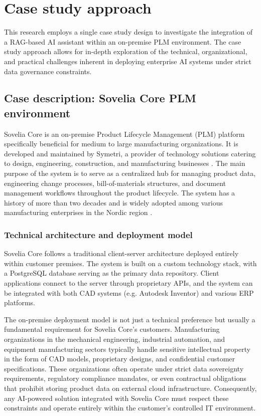 \section{Case study approach}
\label{sec:case-study-approach}

This research employs a single case study design \parencite{yin_case_2018} to investigate the integration of a RAG-based AI assistant within an on-premise PLM environment. The case study approach allows for in-depth exploration of the technical, organizational, and practical challenges inherent in deploying enterprise AI systems under strict data governance constraints.

\subsection{Case description: Sovelia Core PLM environment}
\label{subsec:case-description}

Sovelia Core is an on-premise Product Lifecycle Management (PLM) platform specifically beneficial for medium to large manufacturing organizations. It is developed and maintained by Symetri, a provider of technology solutions catering to design, engineering, construction, and manufacturing businesses \parencite{noauthor_symetri_nodate}. The main purpose of the system is to serve as a centralized hub for managing product data, engineering change processes, bill-of-materials structures, and document management workflows throughout the product lifecycle. The system has a history of more than two decades and is widely adopted among various manufacturing enterprises in the Nordic region \parencite{noauthor_about_nodate}.

\subsubsection{Technical architecture and deployment model}

Sovelia Core follows a traditional client-server architecture deployed entirely within customer premises. The system is built on a custom technology stack, with a PostgreSQL database serving as the primary data repository. Client applications connect to the server through proprietary APIs, and the system can be integrated with both CAD systems (e.g. Autodesk Inventor) and various ERP platforms.

The on-premise deployment model is not just a technical preference but usually a fundamental requirement for Sovelia Core's customers. Manufacturing organizations in the mechanical engineering, industrial automation, and equipment manufacturing sectors typically handle sensitive intellectual property in the form of CAD models, proprietary designs, and confidential customer specifications. These organizations often operate under strict data sovereignty requirements, regulatory compliance mandates, or even contractual obligations that prohibit storing product data on external cloud infrastructure. Consequently, any AI-powered solution integrated with Sovelia Core must respect these constraints and operate entirely within the customer's controlled IT environment.

